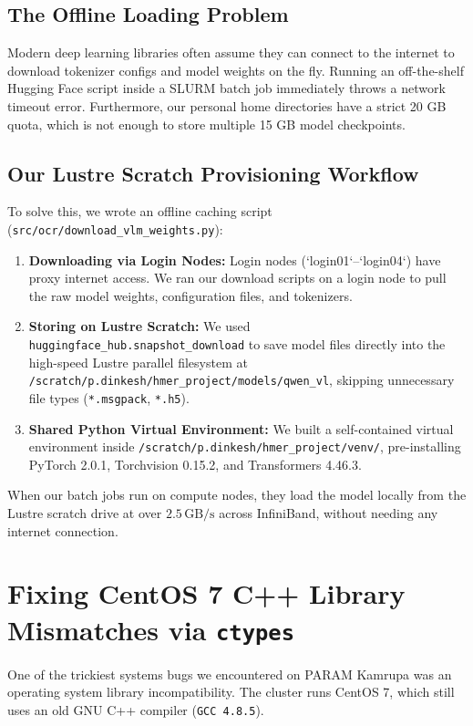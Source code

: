 \subsection{The Offline Loading Problem}
Modern deep learning libraries often assume they can connect to the internet to download tokenizer configs and model weights on the fly. Running an off-the-shelf Hugging Face script inside a SLURM batch job immediately throws a network timeout error. Furthermore, our personal home directories have a strict 20 GB quota, which is not enough to store multiple 15 GB model checkpoints.

\subsection{Our Lustre Scratch Provisioning Workflow}
To solve this, we wrote an offline caching script (\texttt{src/ocr/download\_vlm\_weights.py}):
\begin{enumerate}
    \item \textbf{Downloading via Login Nodes:} Login nodes (`login01`--`login04`) have proxy internet access. We ran our download scripts on a login node to pull the raw model weights, configuration files, and tokenizers.
    \item \textbf{Storing on Lustre Scratch:} We used \texttt{huggingface\_hub.snapshot\_download} to save model files directly into the high-speed Lustre parallel filesystem at \texttt{/scratch/p.dinkesh/hmer\_project/models/qwen\_vl}, skipping unnecessary file types (\texttt{*.msgpack}, \texttt{*.h5}).
    \item \textbf{Shared Python Virtual Environment:} We built a self-contained virtual environment inside \texttt{/scratch/p.dinkesh/hmer\_project/venv/}, pre-installing PyTorch 2.0.1, Torchvision 0.15.2, and Transformers 4.46.3.
\end{enumerate}
When our batch jobs run on compute nodes, they load the model locally from the Lustre scratch drive at over $2.5\,\text{GB/s}$ across InfiniBand, without needing any internet connection.

\section{Fixing CentOS 7 C++ Library Mismatches via \texttt{ctypes}}
\label{sec:cxxabi_resolution}

One of the trickiest systems bugs we encountered on PARAM Kamrupa was an operating system library incompatibility. The cluster runs CentOS 7, which still uses an old GNU C++ compiler (\texttt{GCC 4.8.5}).


